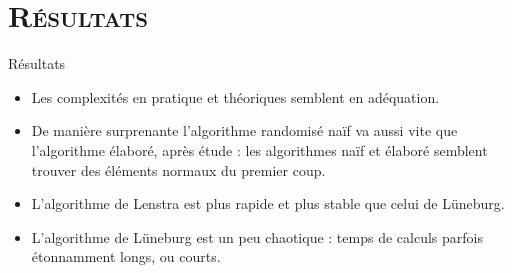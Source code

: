 \documentclass[xcolor=x11names,compress]{beamer}
\theoremstyle{break}
\theoremstyle{sc}
\theoremstyle{definition}
\theoremstyle{remark}
\begin{document}
\section{\scshape Résultats}
\begin{frame}{Résultats}
  \begin{itemize}
    \item Les complexités en pratique et théoriques semblent en adéquation.
    \item De manière surprenante l'algorithme randomisé naïf va aussi vite que
      l'algorithme élaboré, après étude : les algorithmes naïf et élaboré semblent trouver des
      éléments normaux du premier coup.
    \item L'algorithme de Lenstra est plus rapide et plus stable que celui de Lüneburg.
    \item L'algorithme de Lüneburg est un peu chaotique : temps de calculs
      parfois étonnamment longs, ou courts.
  \end{itemize}
\end{frame}

{ %
    \begin{frame}[plain]
     \end{frame}
}
\end{document}
